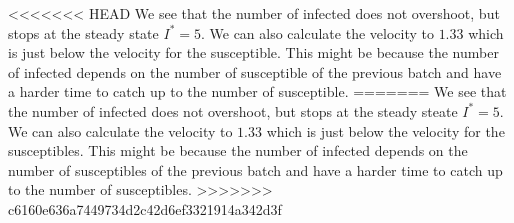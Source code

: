 <<<<<<< HEAD
We see that the number of infected does not overshoot, but stops at the steady state $I^*=5$. We can also calculate the velocity to $1.33$ which is just below the velocity for the susceptible. This might be because the number of infected depends on the number of susceptible of the previous batch and have a harder time to catch up to the number of susceptible.
=======
We see that the number of infected does not overshoot, but stops at the steady steate $I^*=5$. We can also calculate the velocity to $1.33$ which is just below the velocity for the susceptibles. This might be because the number of infected depends on the number of susceptibles of the previous batch and have a harder time to catch up to the number of susceptibles.
>>>>>>> c6160e636a7449734d2c42d6ef3321914a342d3f
